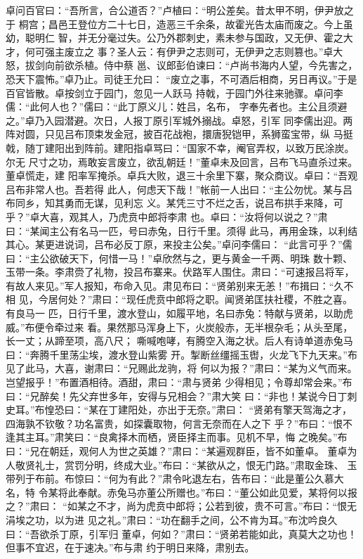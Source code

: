 卓问百官曰：“吾所言，合公道否？”卢植曰：“明公差矣。昔太甲不明，伊尹放之于
桐宫；昌邑王登位方二十七日，造恶三千余条，故霍光告太庙而废之。今上虽幼，聪明仁
智，并无分毫过失。公乃外郡刺史，素未参与国政，又无伊、霍之大才，何可强主废立之
事？圣人云：有伊尹之志则可，无伊尹之志则篡也。”卓大怒，拔剑向前欲杀植。侍中蔡
邕、议郎彭伯谏曰：“卢尚书海内人望，今先害之，恐天下震怖。”卓乃止。司徒王允曰：
“废立之事，不可酒后相商，另日再议。”于是百官皆散。卓按剑立于园门，忽见一人跃马
持戟，于园门外往来驰骤。卓问李儒：“此何人也？”儒曰：“此丁原义儿：姓吕，名布，
字奉先者也。主公且须避之。”卓乃入园潜避。次日，人报丁原引军城外搦战。卓怒，引军
同李儒出迎。两阵对圆，只见吕布顶束发金冠，披百花战袍，擐唐猊铠甲，系狮蛮宝带，纵
马挺戟，随丁建阳出到阵前。建阳指卓骂曰：“国家不幸，阉官弄权，以致万民涂炭。尔无
尺寸之功，焉敢妄言废立，欲乱朝廷！”董卓未及回言，吕布飞马直杀过来。董卓慌走，建
阳率军掩杀。卓兵大败，退三十余里下寨，聚众商议。卓曰：“吾观吕布非常人也。吾若得
此人，何虑天下哉！”帐前一人出曰：“主公勿忧。某与吕布同乡，知其勇而无谋，见利忘
义。某凭三寸不烂之舌，说吕布拱手来降，可乎？”卓大喜，观其人，乃虎贲中郎将李肃
也。卓曰：“汝将何以说之？”肃曰：“某闻主公有名马一匹，号曰赤兔，日行千里。须得
此马，再用金珠，以利结其心。某更进说词，吕布必反丁原，来投主公矣。”卓问李儒曰：
“此言可乎？”儒曰：“主公欲破天下，何惜一马！”卓欣然与之，更与黄金一千两、明珠
数十颗、玉带一条。李肃赍了礼物，投吕布寨来。伏路军人围住。肃曰：“可速报吕将军，
有故人来见。”军人报知，布命入见。肃见布曰：“贤弟别来无恙！”布揖曰：“久不相
见，今居何处？”肃曰：“现任虎贲中郎将之职。闻贤弟匡扶社稷，不胜之喜。有良马一
匹，日行千里，渡水登山，如履平地，名曰赤兔：特献与贤弟，以助虎威。”布便令牵过来
看。果然那马浑身上下，火炭般赤，无半根杂毛；从头至尾，长一丈；从蹄至项，高八尺；
嘶喊咆哮，有腾空入海之状。后人有诗单道赤兔马曰：“奔腾千里荡尘埃，渡水登山紫雾
开。掣断丝缰摇玉辔，火龙飞下九天来。”布见了此马，大喜，谢肃曰：“兄赐此龙驹，将
何以为报？”肃曰：“某为义气而来。岂望报乎！”布置酒相待。酒甜，肃曰：“肃与贤弟
少得相见；令尊却常会来。”布曰：“兄醉矣！先父弃世多年，安得与兄相会？”肃大笑
曰：“非也！某说今日丁刺史耳。”布惶恐曰：“某在丁建阳处，亦出于无奈。”肃曰：
“贤弟有擎天驾海之才，四海孰不钦敬？功名富贵，如探囊取物，何言无奈而在人之下
乎？”布曰：“恨不逢其主耳。”肃笑曰：“良禽择木而栖，贤臣择主而事。见机不早，悔
之晚矣。”布曰：“兄在朝廷，观何人为世之英雄？”肃曰：“某遍观群臣，皆不如董卓。
董卓为人敬贤礼士，赏罚分明，终成大业。”布曰：“某欲从之，恨无门路。”肃取金珠、
玉带列于布前。布惊曰：“何为有此？”肃令叱退左右，告布曰：“此是董公久慕大名，特
令某将此奉献。赤兔马亦董公所赠也。”布曰：“董公如此见爱，某将何以报之？”肃曰：
“如某之不才，尚为虎贲中郎将；公若到彼，贵不可言。”布曰：“恨无涓埃之功，以为进
见之礼。”肃曰：“功在翻手之间，公不肯为耳。”布沈吟良久曰：“吾欲杀丁原，引军归
董卓，何如？”肃曰：“贤弟若能如此，真莫大之功也！但事不宜迟，在于速决。”布与肃
约于明日来降，肃别去。

